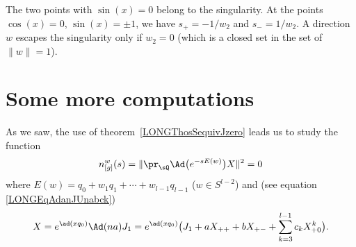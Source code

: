 The two points with $\sin(x)=0$ belong to the singularity. At the points $\cos(x)=0$, $\sin(x)=\pm1$, we have $s_+=-1/w_2$ and $s_-=1/w_2$. A direction $w$ escapes the singularity only if $w_2=0$ (which is a closed set in the set of $\| w \|=1$).


\newcommand{\CaptionFigSFdgHdO}{Points in $\pi(K)$ are classified by their angle in $\SO(2)$. Red points are part of the singularity, points in the black zone belong to the black hole and points in the green zone are free. The upper and lower boundaries belong to the horizon.}



%
\section{Some more computations}
%
\label{LONGSecMoreComputations}

As we saw, the use of theorem~\ref{LONGThosSequivJzero} leads us to study the function
\begin{equation}            \label{LONGEqprSqbignor}
    n_{[g]}^w(s)=\|   \pr_{\sQ} \Ad\big(  e^{-s E(w)} \big)X  \|^2=0
\end{equation}
where $E(w)=q_0+w_1q_1+\cdots+w_{l-1}q_{l-1}$ ($w\in S^{l-2}$) and (see equation \eqref{LONGEqAdanJUnabck})
\begin{equation}
    X=e^{\ad(xq_0)}\Ad(na)J_1=e^{\ad(xq_0)}\big(  J_1+aX_{++}+bX_{+-}+\sum_{k=3}^{l-1}c_kX_{+0}^k\big).
\end{equation}

